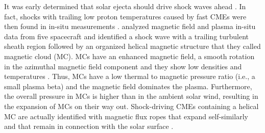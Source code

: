 It was early determined that solar ejecta should drive shock waves ahead \citep{Gold1962}. In fact, shocks with trailing low proton temperatures caused by fast CMEs were then found in in-situ measurements \citep{Gosling1973,Gosling1974}. \citet{Burlaga1981} analyzed magnetic field and plasma in-situ data from five spacecraft and identified a shock wave with a trailing turbulent sheath region followed by an organized helical magnetic structure that they called magnetic cloud (MC). MCs have an enhanced magnetic field, a smooth rotation in the azimuthal magnetic field component and they show low densities and temperatures \citep{Burlaga1981}. Thus, MCs have a low thermal to magnetic pressure ratio (i.e., a small plasma beta) and the magnetic field dominates the plasma. Furthermore, the overall pressure in MCs is higher than in the ambient solar wind, resulting in the expansion of MCs on their way out. Shock-driving CMEs containing a helical MC are actually identified with magnetic flux ropes that expand self-similarly and that remain in connection with the solar surface \citep{Chen1997}.\\

